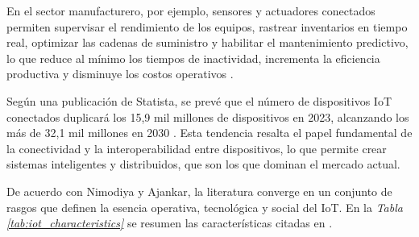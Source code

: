 En el sector manufacturero, por ejemplo, sensores y actuadores conectados permiten supervisar el rendimiento de los equipos, rastrear inventarios en tiempo real, optimizar las cadenas de suministro y habilitar el mantenimiento predictivo, lo que reduce al mínimo los tiempos de inactividad, incrementa la eficiencia productiva y disminuye los costos operativos \cite{dauda_survey_2024}.

Según una publicación de Statista, se prevé que el número de dispositivos IoT conectados duplicará los 15,9 mil millones de dispositivos en 2023, alcanzando los más de 32,1 mil millones en 2030 \cite{vailshery_iot_devices_2023}. Esta tendencia resalta el papel fundamental de la conectividad y la interoperabilidad entre dispositivos, lo que permite crear sistemas inteligentes y distribuidos, que son los que dominan el mercado actual.

De acuerdo con Nimodiya y Ajankar, la literatura converge en un conjunto de rasgos que definen la esencia operativa, tecnológica y social del IoT. En la \textit{Tabla \ref{tab:iot_characteristics}} se resumen las características citadas en \cite{nimodiya_2022_IoTreview}.


